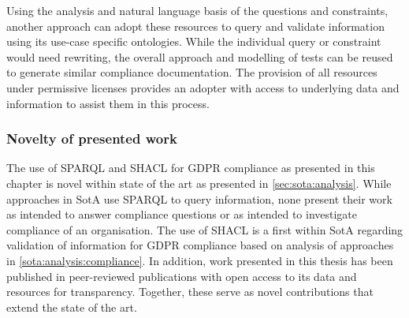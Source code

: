 Using the analysis and natural language basis of the questions and constraints, another approach can adopt these resources to query and validate information using its use-case specific ontologies.
While the individual query or constraint would need rewriting, the overall approach and modelling of tests can be reused to generate similar compliance documentation.
The provision of all resources under permissive licenses provides an adopter with access to underlying data and information to assist them in this process.

\subsubsection*{Novelty of presented work}
The use of SPARQL and SHACL for GDPR compliance as presented in this chapter is novel within state of the art as presented in \autoref{sec:sota:analysis}.
While approaches in SotA use SPARQL to query information, none present their work as intended to answer compliance questions or as intended to investigate compliance of an organisation.
The use of SHACL is a first within SotA regarding validation of information for GDPR compliance based on analysis of approaches in \autoref{sota:analysis:compliance}.
In addition, work presented in this thesis has been published in peer-reviewed publications with open access to its data and resources for transparency.
Together, these serve as novel contributions that extend the state of the art.
